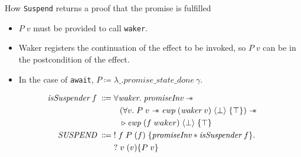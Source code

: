 \documentclass[aspectratio=43]{beamer}
\newcommand{\ocaml}[1]{\texttt{#1}}
\newcommand{\wand}{\mathrel{-\mkern-6mu*}}
\newcommand{\esuspend}{\ocaml{Suspend}}
\newcommand{\pinv}{\textit{promiseInv}}
\begin{document}
\begin{frame}[fragile]{How \esuspend{} returns a proof that the promise is fulfilled}
    \begin{itemize}
        \item \(P\; v\) must be provided to call \ocaml{waker}.
        \item Waker registers the continuation of the effect to be invoked, so \(P\; v\) can be in the postcondition of the effect.
        \item In the case of \ocaml{await}, \(P \coloneqq \lambda \_. promise\_state\_done~\gamma\).
    \end{itemize}
    \begin{align*}
        \textit{isSuspender}\; f\; \Coloneqq & \; \forall \textit{waker}.\; \pinv{} \wand{}                                                                      \\
                                             & \quad (\forall v.\; P\; v \wand{} \textit{ewp}\; (\textit{waker}\; v)\; \langle \bot \rangle\; \{\top \}) \wand{} \\
                                             & \quad \triangleright \textit{ewp}\; (f\; waker)\; \langle \bot \rangle\; \{ \top \}                               \\
        \textit{SUSPEND}\;         \Coloneqq & \; !\; f\; P\; (f)\; \{ \pinv{} \ast \textit{isSuspender}\; f \}.                                                 \\
                                             & \;?\; v\; (v) \{ P\; v \}
    \end{align*}
\end{frame}

\end{document}
